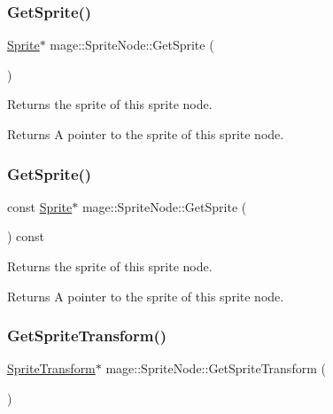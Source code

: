 \subsubsection{\texorpdfstring{Get\+Sprite()}{GetSprite()}\hspace{0.1cm}{\footnotesize\ttfamily [1/2]}}
{\footnotesize\ttfamily \hyperlink{classmage_1_1_sprite}{Sprite}$\ast$ mage\+::\+Sprite\+Node\+::\+Get\+Sprite (\begin{DoxyParamCaption}{ }\end{DoxyParamCaption})\hspace{0.3cm}{\ttfamily [noexcept]}}

Returns the sprite of this sprite node.

\begin{DoxyReturn}{Returns}
A pointer to the sprite of this sprite node. 
\end{DoxyReturn}
\hypertarget{classmage_1_1_sprite_node_a585276a679d83576464014eeb156cf10}{}\label{classmage_1_1_sprite_node_a585276a679d83576464014eeb156cf10} 
\subsubsection{\texorpdfstring{Get\+Sprite()}{GetSprite()}\hspace{0.1cm}{\footnotesize\ttfamily [2/2]}}
{\footnotesize\ttfamily const \hyperlink{classmage_1_1_sprite}{Sprite}$\ast$ mage\+::\+Sprite\+Node\+::\+Get\+Sprite (\begin{DoxyParamCaption}{ }\end{DoxyParamCaption}) const\hspace{0.3cm}{\ttfamily [noexcept]}}

Returns the sprite of this sprite node.

\begin{DoxyReturn}{Returns}
A pointer to the sprite of this sprite node. 
\end{DoxyReturn}
\hypertarget{classmage_1_1_sprite_node_a99d90a2a337a45c0623022756c53f214}{}\label{classmage_1_1_sprite_node_a99d90a2a337a45c0623022756c53f214} 
\subsubsection{\texorpdfstring{Get\+Sprite\+Transform()}{GetSpriteTransform()}\hspace{0.1cm}{\footnotesize\ttfamily [1/2]}}
{\footnotesize\ttfamily \hyperlink{structmage_1_1_sprite_transform}{Sprite\+Transform}$\ast$ mage\+::\+Sprite\+Node\+::\+Get\+Sprite\+Transform (\begin{DoxyParamCaption}{ }\end{DoxyParamCaption})\hspace{0.3cm}{\ttfamily [noexcept]}}

